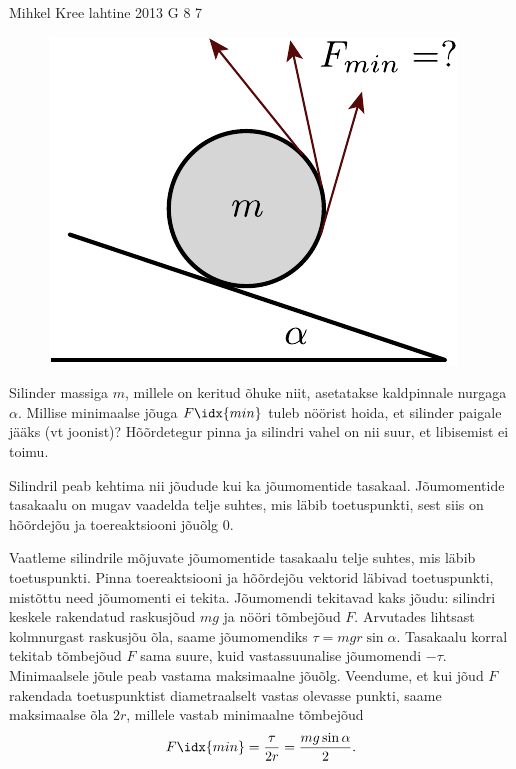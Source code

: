 {Mihkel Kree} %
{lahtine} %
{2013} %
{G 8} %
{7} %
{
\ifStatement
\begin{figure}
\vspace{-15pt}
\includegraphics[width=\linewidth]{2013-lahg-08-joonis_niidirull-crop}
\end{figure}

Silinder massiga $m$, millele on keritud õhuke niit, asetatakse kaldpinnale nurgaga $\alpha$.
Millise minimaalse jõuga $F\idx{min}$ tuleb nöörist hoida, et silinder paigale
jääks (vt joonist)? Hõõrdetegur pinna ja silindri vahel on nii suur, et
libisemist ei toimu.
\fi


\ifHint
Silindril peab kehtima nii jõudude kui ka jõumomentide tasakaal. Jõumomentide tasakaalu on mugav vaadelda telje suhtes, mis läbib toetuspunkti, sest siis on hõõrdejõu ja toereaktsiooni jõuõlg \num{0}.
\fi


\ifSolution
Vaatleme silindrile mõjuvate jõumomentide tasakaalu telje suhtes, mis läbib toetuspunkti. Pinna toereaktsiooni ja hõõrdejõu vektorid läbivad toetuspunkti, mistõttu need jõumomenti ei tekita. Jõumomendi tekitavad kaks jõudu: silindri keskele rakendatud raskusjõud $mg$ ja nööri tõmbejõud $F$. Arvutades lihtsast kolmnurgast raskusjõu õla, saame jõumomendiks $\tau=mgr\sin\alpha$. Tasakaalu korral tekitab tõmbejõud $F$ sama suure, kuid vastassuunalise jõumomendi $-\tau$. Minimaalsele jõule peab vastama maksimaalne jõuõlg. Veendume, et kui jõud $F$ rakendada toetuspunktist diametraalselt vastas olevasse punkti, saame maksimaalse õla $2r$, millele vastab minimaalne tõmbejõud
\[F\idx{min}=\frac{\tau}{2r}=\frac{mg\sin\alpha}{2}.\]
\fi


}

